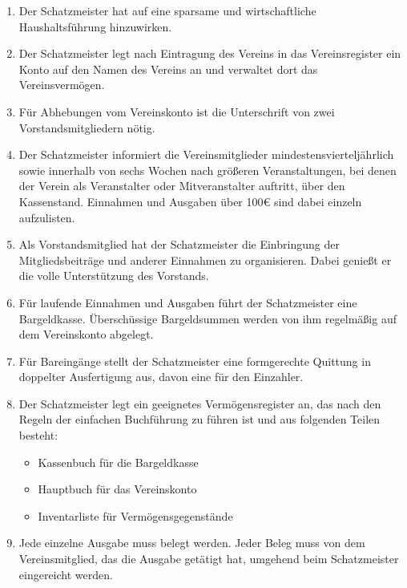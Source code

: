 \documentclass[fontsize=12pt,paper=a4,pagesize]{scrartcl}
\begin{document}
\begin{enumerate}
    \item Der Schatzmeister hat auf eine sparsame und wirtschaftliche
        Haushaltsführung hinzuwirken.

    \item Der Schatzmeister legt nach Eintragung des Vereins in das
        Vereinsregister ein Konto auf den Namen des Vereins an und
        verwaltet dort das Vereinsvermögen.

    \item Für Abhebungen vom Vereinskonto ist die Unterschrift von zwei
        Vorstandsmitgliedern nötig.

    \item Der Schatzmeister informiert die Vereinsmitglieder
        mindestensvierteljährlich sowie innerhalb von sechs Wochen
        nach größeren Veranstaltungen, bei denen der Verein als
        Veranstalter oder Mitveranstalter auftritt, über den
        Kassenstand. Einnahmen und Ausgaben über 100\euro{} sind dabei
        einzeln aufzulisten.

    \item Als Vorstandsmitglied hat der Schatzmeister die Einbringung der
        Mitgliedsbeiträge und anderer Einnahmen zu organisieren. Dabei
        genießt er die volle Unterstützung des Vorstands.

    \item Für laufende Einnahmen und Ausgaben führt der Schatzmeister eine
        Bargeldkasse. Überschüssige Bargeldsummen werden von ihm regelmäßig
        auf dem Vereinskonto abgelegt.

    \item Für Bareingänge stellt der Schatzmeister eine formgerechte
        Quittung in doppelter Ausfertigung aus, davon eine für den Einzahler.

    \item Der Schatzmeister legt ein geeignetes Vermögensregister an, das
        nach den Regeln der einfachen Buchführung zu führen ist und aus
        folgenden Teilen besteht:
        \begin{itemize}
            \item Kassenbuch für die Bargeldkasse
            \item Hauptbuch für das Vereinskonto
            \item Inventarliste für Vermögensgegenstände
        \end{itemize}

    \item Jede einzelne Ausgabe muss belegt werden. Jeder Beleg muss von
        dem Vereinsmitglied, das die Ausgabe getätigt hat, umgehend beim
        Schatzmeister eingereicht werden.


\end{enumerate}
\end{document}
